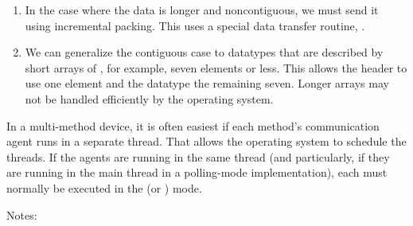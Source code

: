 \begin{enumerate}
\item In the case where the data is longer and noncontiguous, we must send it
  using incremental packing.  This uses a special data transfer routine,
  .

\item We can generalize the contiguous case to datatypes that are described by
  short arrays of , for example, seven elements or less.
  This allows the header to use one element and the datatype the remaining
  seven.  Longer arrays may not be handled efficiently by the operating
  system. 

\end{enumerate}

In a multi-method device, it is often easiest if each method's communication 
agent runs in a separate thread.  That allows the operating system to 
schedule the threads.  If the agents are running in the same thread (and 
particularly, if they are running in the main thread in a polling-mode 
implementation), each must normally be executed in the  (or 
) mode.


Notes:

